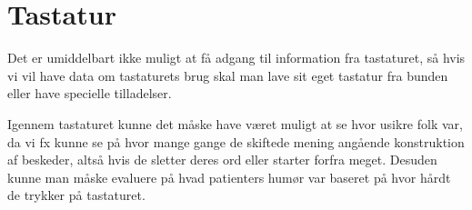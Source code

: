 \section{Tastatur}
Det er umiddelbart ikke muligt at få adgang til information fra tastaturet, så hvis vi vil have data om tastaturets brug skal man lave sit eget tastatur fra bunden eller have specielle tilladelser.

Igennem tastaturet kunne det måske have været muligt at se hvor usikre folk var, da vi fx kunne se på hvor mange gange de skiftede mening angående konstruktion af beskeder, altså hvis de sletter deres ord eller starter forfra meget.
Desuden kunne man måske evaluere på hvad patienters humør var baseret på hvor hårdt de trykker på tastaturet.

\begin{comment}
Idéer til tastatur:
\begin{description}[style=nextline]
\item[Antal Rettelser]
\item[Ordbrug]
\item[Tid for en sætning]
\item[Tryk niveau]
\end{description}

Sensor
\begin{description}[style=nextline]
\item[Kan vi få fat i data?] Lyder som om det ikke er muligt at keylogge globalt. Man kan lave sit eget tastatur som erstatter default tastatur og keylogge derfra, men det lyder ikke til at det er muligt at lave en Service keylogger som får fat i alt som bliver skrevet på devicet.
\item[Er der begrænsninger?] Det lyder til at man bliver nødt til at lave sit eget tastatur.
\item[Hvilke data giver sensoren?] N/A
\end{description}

Da vi ikke tror det er praktisk kan denne nok blive udelukket som en mulighed og vi vil derfor ikke forsætte med analysen.

Analyse
\begin{description}[style=nextline]
\item[Har vi data nok?]
\item[Hvilke data skal benyttes?]
\item[Formål med analysen]
\item[Ide til visualisering (?)]
\item[(kort oprids af fremgangsmåde)]
\item[(gem illustrationer og kilder)]
\end{description}
\end{comment}




